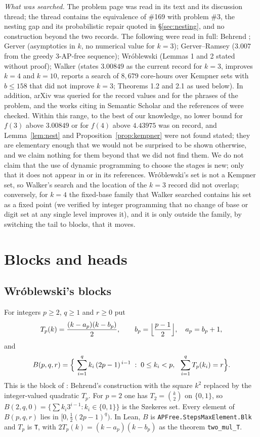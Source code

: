 \documentclass[11pt,a4paper]{article}
\theoremstyle{definition}
\theoremstyle{remark}
\newcommand{\Blk}{B}
\newcommand{\code}[1]{\texttt{#1}}
\begin{document}
\emph{What was searched.} The problem page \cite{EP169} was read in its text and its discussion thread; the thread contains the equivalence of \#169 with problem \#3, the nesting gap and its probabilistic repair quoted in \S\ref{sec:nesting}, and no construction beyond the two records. The following were read in full: Behrend \cite{Be46}; Gerver \cite{Ge77} (asymptotics in $k$, no numerical value for $k=3$); Gerver--Ramsey \cite{GR79} ($3.007$ from the greedy 3-AP-free sequence); Wr\'oblewski \cite{Wr84} (Lemmas 1 and 2 stated without proof); Walker \cite{Wa25} (states $3.00849$ as the current record for $k=3$, improves $k=4$ and $k=10$, reports a search of $8{,}679$ core-hours over Kempner sets with $b \le 158$ that did not improve $k=3$; Theorems 1.2 and 2.1 as used below). In addition, arXiv was queried for the record values and for the phrases of the problem, and the works citing \cite{Wr84} in Semantic Scholar and the references of \cite{Wa25} were checked. Within this range, to the best of our knowledge, no lower bound for $f(3)$ above $3.00849$ or for $f(4)$ above $4.43975$ was on record, and Lemma~\ref{lem:nest} and Proposition~\ref{prop:kempner} were not found stated; they are elementary enough that we would not be surprised to be shown otherwise, and we claim nothing for them beyond that we did not find them. We do not claim that the use of dynamic programming to choose the stages is new; only that it does not appear in \cite{Wa25} or in its references. Wr\'oblewski's set is not a Kempner set, so Walker's search and the location of the $k=3$ record did not overlap; conversely, for $k=4$ the fixed-base family that Walker searched contains his set as a fixed point (we verified by integer programming that no change of base or digit set at any single level improves it), and it is only outside the family, by switching the tail to blocks, that it moves.

\section{Blocks and heads}\label{sec:blocks}

\subsection{Wr\'oblewski's blocks}\label{sec:wrobblocks}

For integers $p\ge2$, $q\ge1$ and $r\ge0$ put
\[
T_p(k) = \frac{(k-a_p)(k-b_p)}{2},\qquad b_p=\Bigl\lfloor\frac{p-1}{2}\Bigr\rfloor,\quad a_p=b_p+1,
\]
and
\[
\Blk(p,q,r)=\Bigl\{\ \sum_{i=1}^{q} k_i\,(2p-1)^{\,i-1} \;:\; 0\le k_i<p,\ \ \sum_{i=1}^q T_p(k_i)=r \Bigr\}.
\]
This is the block of \cite{Wr84}: Behrend's construction \cite{Be46} with the square $k^2$ replaced by the integer-valued quadratic $T_p$. For $p=2$ one has $T_2 = \binom{k}{2}$ on $\{0,1\}$, so $\Blk(2,q,0) = \{\sum k_i 3^{i-1} : k_i \in \{0,1\}\}$ is the Szekeres set. Every element of $\Blk(p,q,r)$ lies in $[0,\tfrac12(2p-1)^q)$. In Lean, $\Blk$ is \code{APFree.\allowbreak{}StepsMaxElement.\allowbreak{}Blk} and $T_p$ is \code{T}, with $2T_p(k) = (k-a_p)(k-b_p)$ as the theorem \code{two\_\allowbreak{}mul\_\allowbreak{}T}.
\end{document}
